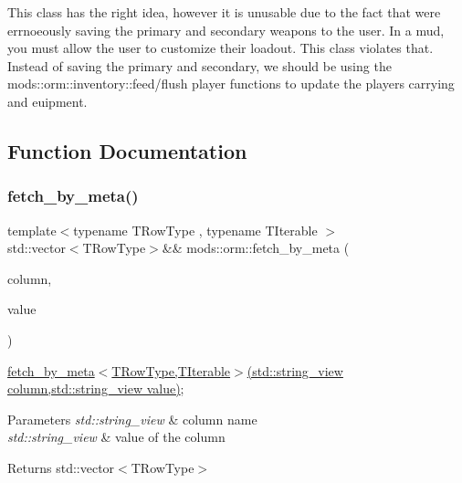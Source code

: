 This class has the right idea, however it is unusable due to the fact that we\textquotesingle{}re errnoeously saving the primary and secondary weapons to the user. In a mud, you must allow the user to customize their loadout. This class violates that. Instead of saving the primary and secondary, we should be using the mods\+::orm\+::inventory\+::feed/flush player functions to update the player\textquotesingle{}s carrying and euipment. 

\subsection{Function Documentation}
\mbox{\label{namespacemods_1_1orm_a2ab3ea4b32ee4d381314c237155249ac}} 
\subsubsection{\texorpdfstring{fetch\+\_\+by\+\_\+meta()}{fetch\_by\_meta()}}
{\footnotesize\ttfamily template$<$typename T\+Row\+Type , typename T\+Iterable $>$ \\
std\+::vector$<$T\+Row\+Type$>$\&\& mods\+::orm\+::fetch\+\_\+by\+\_\+meta (\begin{DoxyParamCaption}\item[{std\+::string\+\_\+view}]{column,  }\item[{std\+::string\+\_\+view}]{value }\end{DoxyParamCaption})}

\hyperlink{namespacemods_1_1orm_a2ab3ea4b32ee4d381314c237155249ac}{fetch\+\_\+by\+\_\+meta$<$\+T\+Row\+Type,\+T\+Iterable$>$(std\+::string\+\_\+view column,std\+::string\+\_\+view value)}; 
\begin{DoxyParams}{Parameters}
{\em std\+::string\+\_\+view} & column name \\
\hline
{\em std\+::string\+\_\+view} & value of the column \\
\hline
\end{DoxyParams}
\begin{DoxyReturn}{Returns}
std\+::vector$<$\+T\+Row\+Type$>$ 
\end{DoxyReturn}
\mbox{\label{namespacemods_1_1orm_adfe5cbbffe9a35eeccfedcda9b1a7d20}} 
